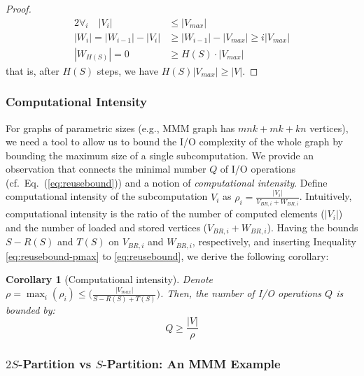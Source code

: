 \documentclass[sigplan,review,anonymous]{acmart}\settopmatter{printfolios=true,printccs=false,printacmref=false}
\newtheorem*{corollary*}{Corollary}
\begin{document}
\begin{proof}
	\vspace{-0.5em}
	\begin{alignat}{2}
	\nonumber
	\forall_{i}\quad |V_i| & \le |V_{max}| \\
	\nonumber
	|W_i| = |W_{i-1}| - |V_i| & \ge |W_{i-1}| - |V_{max}| \ge i|V_{max}| \\
	\nonumber
	|W_{H(S)}| = 0 & \ge H(S) \cdot |V_{max}| 
	\end{alignat}
	\vspace{-0.5em}
	that is, after $H(S)$ steps, we have $H(S) |V_{max}| \ge |V|$.
\end{proof}



\subsubsection{Computational Intensity}
\label{sec:compIntensity}

For graphs of parametric sizes (e.g., MMM graph has $mnk + mk + kn$ vertices), 
we need a tool to allow us to bound the I/O complexity of the whole graph by 
bounding the maximum size of a single subcomputation. We provide an observation 
that connects the minimal 
number $Q$ of
I/O operations
(cf.~Eq.~(\ref{eq:reusebound})) and a notion
of \emph{computational intensity}.
%
Define computational intensity of the subcomputation $V_i$ as $\rho_i =
\frac{|V_i|}{V_{BR,i} + W_{BR,i}}$. Intuitively, computational intensity is the 
ratio of 
the number of computed elements ($|V_i|$) and the number of loaded and stored 
vertices ($V_{BR,i} + W_{BR,i}$). Having the bounds $S - R(S)$ and $T(S)$ on 
$V_{BR,i}$ and $W_{BR,i}$, respectively, and inserting Inequality 
\ref{eq:reusebound-pmax} to \ref{eq:reusebound}, we 
derive the following corollary:

\begin{corollary*}[Computational intensity]
	\label{cor:q}
	Denote $\rho = \max_i(\rho_i) \le \Big(\frac{|V_{max}|}{S-R(S) + 
	T(S)}\Big)$. Then, the number of I/O operations $Q$ is bounded by:
	\begin{equation}
	Q \ge \frac{|V|}{\rho}
	\end{equation} 
\end{corollary*}

\subsubsection{$2S$-Partition vs $S$-Partition: An MMM Example}
\end{document}
